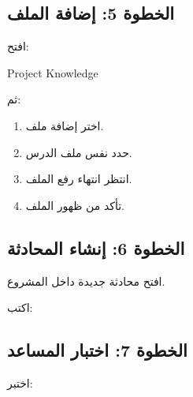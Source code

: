 \documentclass[a4paper]{article}
\begin{document}

\subsection*{\khatt الخطوة 5: إضافة الملف}

افتح:

\begin{center}

\textenglish{Project Knowledge}

\end{center}

ثم:

\begin{enumerate}

    \item اختر إضافة ملف.

    \item حدد نفس ملف الدرس.

    \item انتظر انتهاء رفع الملف.

    \item تأكد من ظهور الملف.

\end{enumerate}



\subsection*{\khatt الخطوة 6: إنشاء المحادثة}

افتح محادثة جديدة داخل المشروع.

اكتب:

\begin{center}


\end{center}



\subsection*{\khatt الخطوة 7: اختبار المساعد}

اختبر:
\end{document}
